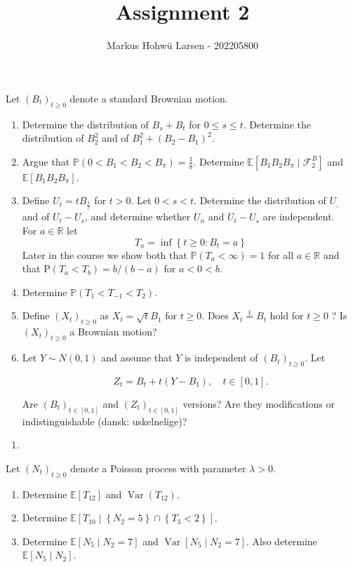\documentclass{Class}
\title{Assignment 2}
\author{Markus Hohwü Larsen - 202205800}
\begin{document}
Let $\left(B_t\right)_{t \geq 0}$ denote a standard Brownian motion.
\begin{enumerate}
    \item Determine the distribution of $B_s+B_t$ for $0 \leq s \leq t$. Determine the distribution of $B_2^2$ and of $B_1^2+\left(B_2-B_1\right)^2$.
    \item Argue that $\mathbb{P}\left(0<B_1<B_2<B_\pi\right)=\frac{1}{8}$. Determine $\mathbb{E}\left[B_1 B_2 B_\pi \mid \mathcal{F}_2^B\right]$ and $\mathbb{E}\left[B_1 B_2 B_\pi\right]$.
    \item Define $U_t=t B_{\frac{1}{t}}$ for $t>0$. Let $0<s<t$. Determine the distribution of $U_{\text {, }}$ and of $U_t-U_s$, and determine whether $U_n$ and $U_t-U_s$ are independent.
    \\For $a \in \mathbb{R}$ let $$
    T_a=\inf \left\{t \geq 0: B_t=a\right\}
    $$Later in the course we show both that $\mathbb{P}\left(T_a<\infty\right)=1$ for all $a \in \mathbb{R}$ and that $\mathrm{P}\left(T_a<T_b\right)=b /(b-a)$ for $a<0<b$.
    \item Determine $\mathbb{P}\left(T_1<T_{-1}<T_2\right)$.
    \item Define $\left(X_t\right)_{t \geq 0}$ as $X_t=\sqrt{t} B_1$ for $t \geq 0$. Does $X_t \stackrel{t}{=} B_t$ hold for $t \geq 0$ ? Is $\left(X_t\right)_{t \geq 0}$ a Brownian motion?
    \item  Let $Y \sim N(0,1)$ and assume that $Y$ is independent of $\left(B_t\right)_{t \geq 0}$. Let

    $$
    Z_t=B_t+t\left(Y-B_1\right), \quad t \in[0,1] .
    $$
    
    
    Are $\left(B_t\right)_{t \in[0,1]}$ and $\left(Z_t\right)_{t \in[0,1]}$ versions? Are they modifications or indistinguishable (dansk: uskelnelige)?
\end{enumerate}
\solution
\begin{enumerate}
    \item 
\end{enumerate}
Let $\left(N_t\right)_{t \geq 0}$ denote a Poisson process with parameter $\lambda>0$.
\begin{enumerate}
    \item Determine $\mathbb{E}\left[T_{12}\right]$ and $\operatorname{Var}\left(T_{12}\right)$.
    \item Determine $\mathbb{E}\left[T_{10} \mid\left\{N_2=5\right\} \cap\left\{T_3<2\right\}\right]$.
    \item Determine $\mathbb{E}\left[N_5 \mid N_2=7\right]$ and $\operatorname{Var}\left[N_5 \mid N_2=7\right]$. Also determine $\mathbb{E}\left[N_5 \mid N_2\right]$.
\end{enumerate}
\end{document}
